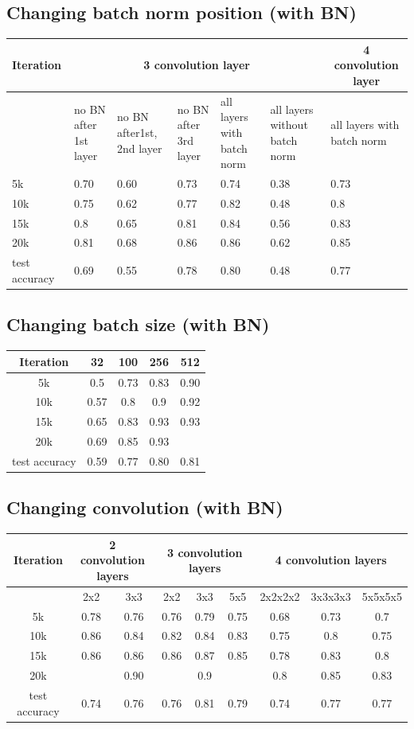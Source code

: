 \documentclass[journal,onecolumn]{IEEEtran}
\begin{document}
\subsection{Changing batch norm position (with BN)}
\begin{tabular}{ | p{2cm} | *5{p{2cm}} | p{2cm} | }
  \hline
  Iteration & \multicolumn{5}{|c|}{3 convolution layer} & \multicolumn{1}{|c|}{4 convolution layer} \\
  \hline
  {} & no BN after 1st layer & no BN after1st, 2nd layer & no BN after 3rd layer & all layers with batch norm & all layers without batch norm & all layers with batch norm\\
  \hline
  5k & 0.70 & 0.60 & 0.73 & 0.74 & 0.38 & 0.73\\
  10k & 0.75 & 0.62 & 0.77 & 0.82 & 0.48 & 0.8\\
  15k & 0.8 & 0.65 & 0.81 & 0.84 & 0.56 & 0.83\\
  20k & 0.81 & 0.68 & 0.86 & 0.86 & 0.62 & 0.85\\
  test accuracy & 0.69 & 0.55 & 0.78 & 0.80 & 0.48 & 0.77 \\
  \hline
\end{tabular}

\subsection{Changing batch size (with BN)}
\begin{tabular}{*5c}
  \hline
  Iteration & 32 & 100 & 256 & 512\\
  \hline
  5k & 0.5 & 0.73 & 0.83 & 0.90\\
  10k & 0.57 & 0.8 & 0.9 & 0.92\\
  15k & 0.65 & 0.83 & 0.93 & 0.93\\
  20k & 0.69 & 0.85 & 0.93 & {}\\
  test accuracy & 0.59 & 0.77 & 0.80 & 0.81\\
  \hline
\end{tabular}

\subsection{Changing convolution (with BN)}
\begin{tabular}{*9c}
  \hline
  Iteration & \multicolumn{2}{c}{2 convolution layers} & \multicolumn{3}{c}{3 convolution layers} & \multicolumn{3}{c}{4 convolution layers}\\
  \hline
  {} & 2x2 & 3x3 & 2x2 & 3x3 & 5x5 & 2x2x2x2 & 3x3x3x3 & 5x5x5x5\\
  \hline
  5k & 0.78 & 0.76 & 0.76 & 0.79 & 0.75 & 0.68 & 0.73 & 0.7\\
  10k & 0.86 & 0.84 & 0.82 & 0.84 & 0.83 & 0.75 & 0.8 & 0.75\\
  15k & 0.86 & 0.86 & 0.86 & 0.87 & 0.85 & 0.78 & 0.83 & 0.8\\
  20k & {} & 0.90 & {} & 0.9 & {} & 0.8 & 0.85 & 0.83\\
  test accuracy & 0.74 & 0.76 & 0.76 & 0.81 & 0.79 & 0.74 & 0.77 & 0.77\\
  \hline
\end{tabular}
\end{document}
